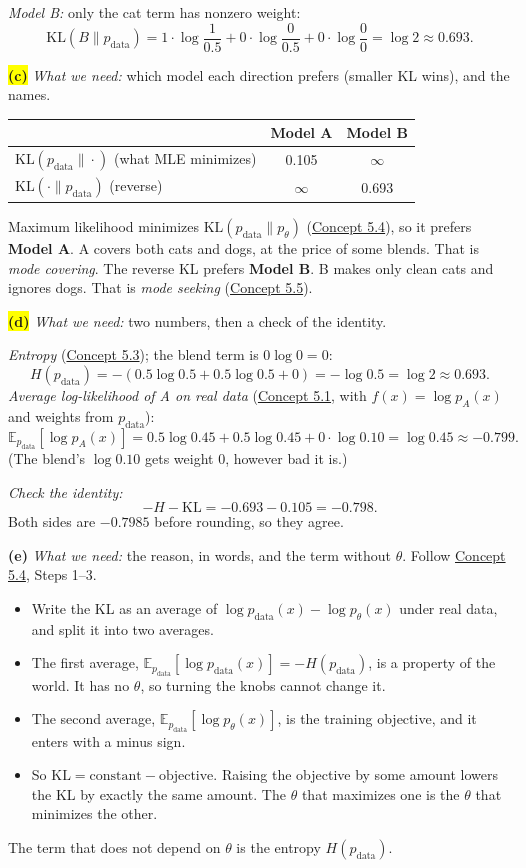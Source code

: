 \documentclass[12pt,a4paper]{article}
\begin{document}
\emph{Model B:} only the cat term has nonzero weight:
\[
\mathrm{KL}(B\|p_{\text{data}})=1\cdot\log\frac{1}{0.5}+0\cdot\log\frac{0}{0.5}+0\cdot\log\frac{0}{0}=\log2\approx0.693 .
\]

\colorbox{yellow}{\textbf{(c)}} \emph{What we need:} which model each direction prefers (smaller KL wins), and the names.

\begin{center}
\begin{tabular}{@{}lcc@{}}
\toprule
 & Model A & Model B \\
\midrule
$\mathrm{KL}(p_{\text{data}}\|\cdot)$ (what MLE minimizes) & 0.105 & $\infty$ \\
$\mathrm{KL}(\cdot\|p_{\text{data}})$ (reverse) & $\infty$ & 0.693 \\
\bottomrule
\end{tabular}
\end{center}
Maximum likelihood minimizes $\mathrm{KL}(p_{\text{data}}\|p_\theta)$ (\hyperref[c5-4]{Concept 5.4}), so it prefers \textbf{Model A}. A covers both cats and dogs, at the price of some blends. That is \emph{mode covering}. The reverse KL prefers \textbf{Model B}. B makes only clean cats and ignores dogs. That is \emph{mode seeking} (\hyperref[c5-5]{Concept 5.5}).

\colorbox{yellow}{\textbf{(d)}} \emph{What we need:} two numbers, then a check of the identity.

\emph{Entropy} (\hyperref[c5-3]{Concept 5.3}); the blend term is $0\log0=0$:
\[
H(p_{\text{data}})=-(0.5\log0.5+0.5\log0.5+0)=-\log0.5=\log2\approx0.693 .
\]
\emph{Average log-likelihood of A on real data} (\hyperref[c5-1]{Concept 5.1}, with $f(x)=\log p_A(x)$ and weights from $p_{\text{data}}$):
\[
\mathbb{E}_{p_{\text{data}}}[\log p_A(x)]=0.5\log0.45+0.5\log0.45+0\cdot\log0.10=\log0.45\approx-0.799 .
\]
(The blend's $\log0.10$ gets weight 0, however bad it is.)

\emph{Check the identity:}
\[
-H-\mathrm{KL}=-0.693-0.105=-0.798 .
\]
Both sides are $-0.7985$ before rounding, so they agree.

\textbf{(e)} \emph{What we need:} the reason, in words, and the term without $\theta$. Follow \hyperref[c5-4]{Concept 5.4}, Steps 1--3.
\begin{itemize}[nosep]
  \item Write the KL as an average of $\log p_{\text{data}}(x)-\log p_\theta(x)$ under real data, and split it into two averages.
  \item The first average, $\mathbb{E}_{p_{\text{data}}}[\log p_{\text{data}}(x)]=-H(p_{\text{data}})$, is a property of the world. It has no $\theta$, so turning the knobs cannot change it.
  \item The second average, $\mathbb{E}_{p_{\text{data}}}[\log p_\theta(x)]$, is the training objective, and it enters with a minus sign.
  \item So $\mathrm{KL}=\text{constant}-\text{objective}$. Raising the objective by some amount lowers the KL by exactly the same amount. The $\theta$ that maximizes one is the $\theta$ that minimizes the other.
\end{itemize}
The term that does not depend on $\theta$ is the entropy $H(p_{\text{data}})$.
\newpage
\end{document}
